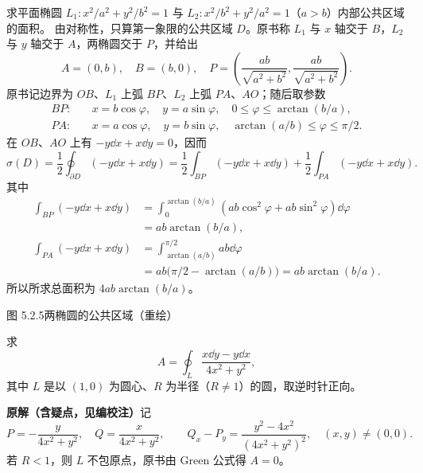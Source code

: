 求平面椭圆 $L_1:x^2/a^2+y^2/b^2=1$ 与 $L_2:x^2/b^2+y^2/a^2=1$（$a>b$）内部公共区域的面积。
\sol 由对称性，只算第一象限的公共区域 $D$。原书称 $L_1$ 与 $x$ 轴交于 $B$，$L_2$ 与 $y$ 轴交于 $A$，两椭圆交于 $P$，并给出
\[
A=(0,b),\quad B=(b,0),\quad P=\left(\frac{ab}{\sqrt{a^2+b^2}},\frac{ab}{\sqrt{a^2+b^2}}\right).
\]
原书记边界为 $OB$、$L_1$ 上弧 $BP$、$L_2$ 上弧 $PA$、$AO$；随后取参数
\[
\begin{aligned}
BP:&\quad x=b\cos\varphi,\quad y=a\sin\varphi,\quad 0\le\varphi\le\arctan(b/a),\\
PA:&\quad x=a\cos\varphi,\quad y=b\sin\varphi,\quad \arctan(a/b)\le\varphi\le\pi/2.
\end{aligned}
\]
在 $OB$、$AO$ 上有 $-y\dd x+x\dd y=0$，因而
\[
\sigma(D)=\frac12\oint_{\partial D}(-y\dd x+x\dd y)
=\frac12\int_{BP}(-y\dd x+x\dd y)+\frac12\int_{PA}(-y\dd x+x\dd y).
\]
其中
\begin{align*}
\int_{BP}(-y\dd x+x\dd y)&=\int_0^{\arctan(b/a)}(ab\cos^2\varphi+ab\sin^2\varphi)\dd\varphi\\
&=ab\arctan(b/a),\\
\int_{PA}(-y\dd x+x\dd y)&=\int_{\arctan(a/b)}^{\pi/2}ab\dd\varphi\\
&=ab\bigl(\pi/2-\arctan(a/b)\bigr)=ab\arctan(b/a).
\end{align*}
所以所求总面积为 $4ab\arctan(b/a)$。
\begin{center}\begin{minipage}{\linewidth}\centering
{}\par{\small 图 5.2.5\quad 两椭圆的公共区域（重绘）}
\end{minipage}\end{center}

求
\[
A=\oint_L\frac{x\dd y-y\dd x}{4x^2+y^2},
\]
其中 $L$ 是以 $(1,0)$ 为圆心、$R$ 为半径（$R\ne1$）的圆，取逆时针正向。
\par\textbf{原解（含疑点，见编校注）}\quad 记
\[
P=-\frac y{4x^2+y^2},\quad Q=\frac x{4x^2+y^2},\qquad
Q_x-P_y=\frac{y^2-4x^2}{(4x^2+y^2)^2},\quad (x,y)\ne(0,0).
\]
若 $R<1$，则 $L$ 不包原点，原书由 Green 公式得 $A=0$。

